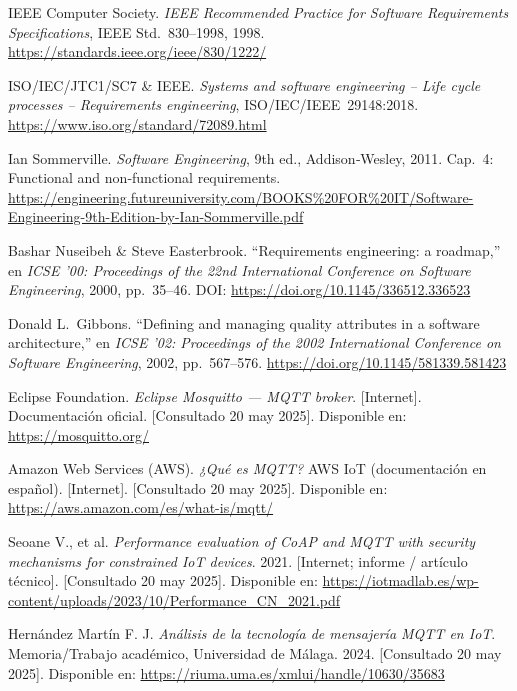 \documentclass[12pt, a4paper]{article}
\begin{document}
\begin{thebibliography}{9}
	IEEE Computer Society.
	\textit{IEEE Recommended Practice for Software Requirements Specifications},
	IEEE Std.\ 830--1998, 1998.
	\url{https://standards.ieee.org/ieee/830/1222/}
	
	ISO/IEC/JTC1/SC7 \& IEEE.
	\textit{Systems and software engineering -- Life cycle processes -- Requirements engineering},
	ISO/IEC/IEEE 29148:2018.
	\url{https://www.iso.org/standard/72089.html}
	
	Ian Sommerville.
	\textit{Software Engineering}, 9th ed.,
	Addison‐Wesley, 2011. Cap. 4: Functional and non‐functional requirements.
	\url{https://engineering.futureuniversity.com/BOOKS%20FOR%20IT/Software-Engineering-9th-Edition-by-Ian-Sommerville.pdf}
	

	Bashar Nuseibeh \& Steve Easterbrook.  
	``Requirements engineering: a roadmap,''  
	en \textit{ICSE '00: Proceedings of the 22nd International Conference on Software Engineering}, 2000, pp.~35--46.  
	DOI: \url{https://doi.org/10.1145/336512.336523}
	
	Donald L.\ Gibbons.  
	``Defining and managing quality attributes in a software architecture,''  
	en \textit{ICSE '02: Proceedings of the 2002 International Conference on Software Engineering}, 2002, pp.~567--576.  
	\url{https://doi.org/10.1145/581339.581423}
	


	Eclipse Foundation. \textit{Eclipse Mosquitto — MQTT broker}. [Internet].
	Documentación oficial. [Consultado 20 may 2025]. Disponible en: \url{https://mosquitto.org/}
	
	Amazon Web Services (AWS). \textit{¿Qué es MQTT?} AWS IoT (documentación en español). [Internet]. [Consultado 20 may 2025]. Disponible en: \url{https://aws.amazon.com/es/what-is/mqtt/}
	
	Seoane V., et al. \textit{Performance evaluation of CoAP and MQTT with security mechanisms for constrained IoT devices}. 2021. [Internet; informe / artículo técnico]. [Consultado 20 may 2025]. Disponible en: \url{https://iotmadlab.es/wp-content/uploads/2023/10/Performance_CN_2021.pdf}
	
	Hernández Martín F. J. \textit{Análisis de la tecnología de mensajería MQTT en IoT}. Memoria/Trabajo académico, Universidad de Málaga. 2024. [Consultado 20 may 2025]. Disponible en: \url{https://riuma.uma.es/xmlui/handle/10630/35683}


\end{thebibliography}
\end{document}
